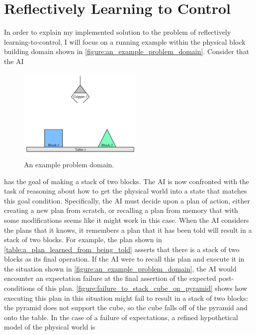 \chapter{Reflectively Learning to Control}
\label{chapter:reflectively_learning_to_control}

In order to explain my implemented solution to the problem of
reflectively learning-to-control, I will focus on a running example
within the physical block building domain shown in
\autoref{figure:an_example_problem_domain}.  Consider that the AI 
\begin{figure}
  \includegraphics[width=6cm]{gfx/blocks_world_example-1}
  \caption[An example problem domain.]{An example problem domain.}
  \label{figure:an_example_problem_domain}
\end{figure}
has the goal of making a stack of two blocks.  The AI is now
confronted with the task of reasoning about how to get the physical
world into a state that matches this goal condition.  Specifically,
the AI must decide upon a plan of action, either creating a new plan
from scratch, or recalling a plan from memory that with some
modifications seems like it might work in this case.  When the AI
considers the plans that it knows, it remembers a plan that it has
been told will result in a stack of two blocks.  For example, the plan
shown in {\mbox{\autoref{table:a_plan_learned_from_being_told}}}
asserts that there is a stack of two blocks as its final operation.
If the AI were to recall this plan and execute it in the situation
shown in \autoref{figure:an_example_problem_domain}, the AI would
encounter an expectation failure at the final assertion of the
expected post-conditions of this plan.
{\mbox{\autoref{figure:failure_to_stack_cube_on_pyramid}}} shows how
executing this plan in this situation might fail to result in a stack
of two blocks: the pyramid does not support the cube, so the cube
falls off of the pyramid and onto the table.  In the case of a failure
of expectations, a refined hypothetical model of the physical world is
